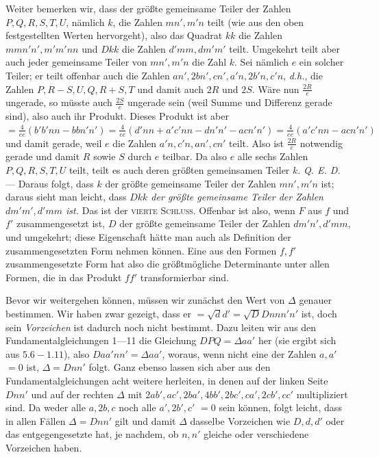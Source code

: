 Weiter bemerken wir, dass der größte gemeinsame Teiler der Zahlen $P,\allowbreak Q,\allowbreak R,\allowbreak S,\allowbreak T,\allowbreak U$, nämlich $k$, die Zahlen $mn',m'n$ teilt (wie aus den oben festgestellten Werten hervorgeht), also das Quadrat $kk$ die Zahlen $mmn'n',m'm'nn$ und $Dkk$ die Zahlen $d'mm,dm'm'$ teilt. Umgekehrt teilt aber auch jeder gemeinsame Teiler von $mn',m'n$ die Zahl $k$. Sei nämlich $e$ ein solcher Teiler; er teilt offenbar auch die Zahlen $an',2bn',cn',a'n,2b'n,c'n$, \textit{d.h.}, die Zahlen $P,R-S,U,Q,R+S,T$ und damit auch $2R$ und $2S$. Wäre nun $\frac{2R}{e}$ ungerade, so müsste auch $\frac{2S}{e}$ ungerade sein (weil Summe und Differenz gerade sind), also auch ihr Produkt. Dieses Produkt ist aber $=\frac{4}{ee}(b'b'nn-bbn'n')=\frac{4}{ee}(d'nn+a'c'nn-dn'n'-acn'n')=\frac{4}{ee}(a'c'nn-acn'n')$ und damit gerade, weil $e$ die Zahlen $a'n,c'n,an',cn'$ teilt. Also ist $\frac{2R}{e}$ notwendig gerade und damit $R$ sowie $S$ durch $e$ teilbar. Da also $e$ alle sechs Zahlen $P,Q,R,S,T,U$ teilt, teilt es auch deren größten gemeinsamen Teiler $k$. \textit{Q. E. D.} --- Daraus folgt, dass $k$ der größte gemeinsame Teiler der Zahlen $mn',m'n$ ist; daraus sieht man leicht, dass \textit{$Dkk$ der größte gemeinsame Teiler der Zahlen $dm'm',d'mm$ ist.} Das ist der \textsc{vierte Schluss}. Offenbar ist also, wenn $F$ aus $f$ und $f'$ zusammengesetzt ist, $D$ der größte gemeinsame Teiler der Zahlen $dm'n',d'mm$, und umgekehrt; diese Eigenschaft hätte man auch als Definition der zusammengesetzten Form nehmen können. Eine aus den
Formen $f,f'$ zusammengesetzte Form hat also die größtmögliche Determinante unter allen Formen, die in das Produkt $ff'$ transformierbar sind.

Bevor wir weitergehen können, müssen wir zunächst den Wert von $\Delta$ genauer bestimmen. Wir haben zwar gezeigt, dass er $=\surd dd'=\surd DDnnn'n'$ ist, doch sein \textit{Vorzeichen} ist dadurch noch nicht bestimmt. Dazu leiten wir aus den Fundamentalgleichungen 1---11 die Gleichung $DPQ=\Delta aa'$ her (sie ergibt sich aus $5.6-1.11$), also $Daa'nn'=\Delta aa'$, woraus, wenn nicht eine der Zahlen $a,a'$ $=0$ ist, $\Delta=Dnn'$ folgt. Ganz ebenso lassen sich aber aus den Fundamentalgleichungen acht weitere herleiten, in denen auf der linken Seite $Dnn'$ und auf der rechten $\Delta$ mit $2ab',ac',2ba',4bb',2bc',ca',2cb',cc'$ multipliziert sind. Da weder alle $a,2b,c$ noch alle $a',2b',c'$ $=0$ sein können, folgt leicht, dass in allen Fällen $\Delta=Dnn'$ gilt und damit $\Delta$ dasselbe Vorzeichen wie $D,d,d'$ oder das entgegengesetzte hat, je nachdem, ob $n,n'$ gleiche oder verschiedene Vorzeichen haben.

